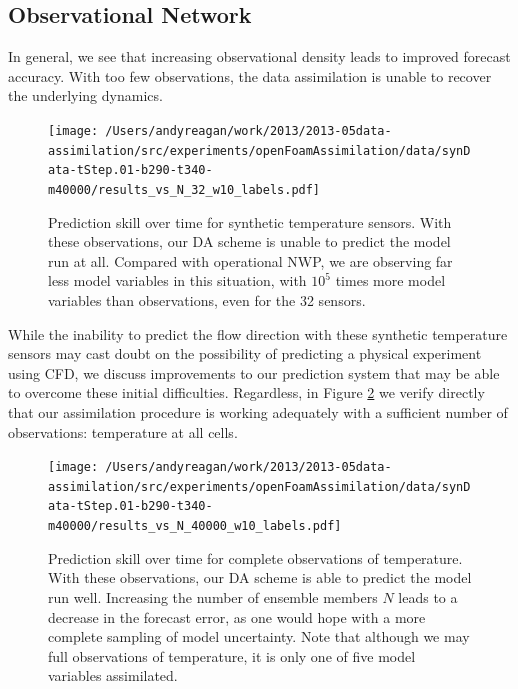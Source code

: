 \documentclass[12pt]{report}
\begin{document}
\subsection{Observational Network}

In general, we see that increasing observational density leads to improved forecast accuracy.
With too few observations, the data assimilation is unable to recover the underlying dynamics.

\begin{figure}[h!]
  \centering
  \texttt{[image: /Users/andyreagan/work/2013/2013-05data-assimilation/src/experiments/openFoamAssimilation/data/synData-tStep.01-b290-t340-m40000/results\_vs\_N\_32\_w10\_labels.pdf]}
  \caption[Prediction skill over time for synthetic temperature sensors]{
    Prediction skill over time for synthetic temperature sensors.
    With these observations, our DA scheme is unable to predict the model run at all.
    Compared with operational NWP, we are observing far less model variables in this situation, with $10^5$ times more model variables than observations, even for the 32 sensors.
  }
  \label{fig:TsensorExp}
\end{figure}

While the inability to predict the flow direction with these synthetic temperature sensors may cast doubt on the possibility of predicting a physical experiment using CFD, we discuss improvements to our prediction system that may be able to overcome these initial difficulties.
Regardless, in Figure \ref{fig:fullObsExp} we verify directly that our assimilation procedure is working adequately with a sufficient number of observations: temperature at all cells.

\begin{figure}[h!]
  \centering
  \texttt{[image: /Users/andyreagan/work/2013/2013-05data-assimilation/src/experiments/openFoamAssimilation/data/synData-tStep.01-b290-t340-m40000/results\_vs\_N\_40000\_w10\_labels.pdf]}
  \caption[Prediction skill over time for complete observations of temperature]{
    Prediction skill over time for complete observations of temperature.
    With these observations, our DA scheme is able to predict the model run well.
    Increasing the number of ensemble members $N$ leads to a decrease in the forecast error, as one would hope with a more complete sampling of model uncertainty.
    Note that although we may full observations of temperature, it is only one of five model variables assimilated.
  }
  \label{fig:fullObsExp}
\end{figure}
\end{document}
